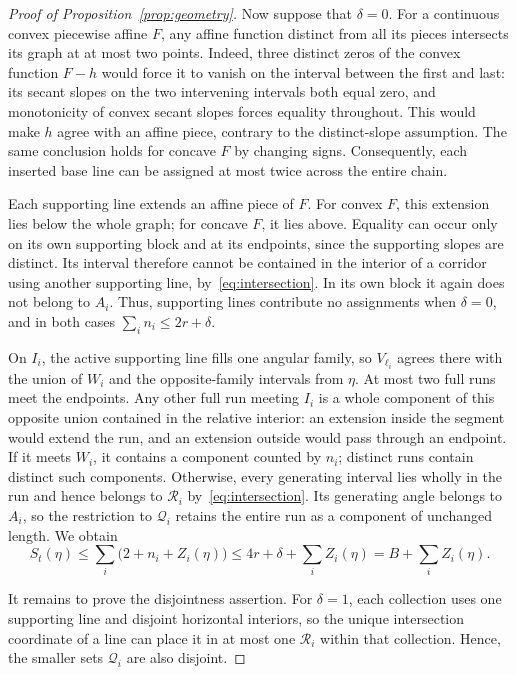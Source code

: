 \documentclass[11pt,letterpaper]{article}
\begin{document}
\begin{proof}[Proof of Proposition~\ref{prop:geometry}]
Now suppose that $\delta=0$. For a continuous convex piecewise affine $F$, any affine function distinct from all its pieces intersects its graph at at most two points. Indeed, three distinct zeros of the convex function $F-h$ would force it to vanish on the interval between the first and last: its secant slopes on the two intervening intervals both equal zero, and monotonicity of convex secant slopes forces equality throughout. This would make $h$ agree with an affine piece, contrary to the distinct-slope assumption. The same conclusion holds for concave $F$ by changing signs. Consequently, each inserted base line can be assigned at most twice across the entire chain.

Each supporting line extends an affine piece of $F$. For convex $F$, this extension lies below the whole graph; for concave $F$, it lies above. Equality can occur only on its own supporting block and at its endpoints, since the supporting slopes are distinct. Its interval therefore cannot be contained in the interior of a corridor using another supporting line, by~\eqref{eq:intersection}. In its own block it again does not belong to $A_i$. Thus, supporting lines contribute no assignments when $\delta=0$, and in both cases $\sum_i n_i\le2r+\delta$.

On $I_i$, the active supporting line fills one angular family, so $V_{\ell_i}$ agrees there with the union of $W_i$ and the opposite-family intervals from $\eta$. At most two full runs meet the endpoints. Any other full run meeting $I_i$ is a whole component of this opposite union contained in the relative interior: an extension inside the segment would extend the run, and an extension outside would pass through an endpoint. If it meets $W_i$, it contains a component counted by $n_i$; distinct runs contain distinct such components. Otherwise, every generating interval lies wholly in the run and hence belongs to $\mathscr R_i$ by~\eqref{eq:intersection}. Its generating angle belongs to $A_i$, so the restriction to $\mathscr Q_i$ retains the entire run as a component of unchanged length. We obtain
\begin{equation}\label{eq:assign}
 S_t(\eta)\le\sum_i\big(2+n_i+Z_i(\eta)\big)
             \le4r+\delta+\sum_iZ_i(\eta)=B+\sum_iZ_i(\eta).
\end{equation}

It remains to prove the disjointness assertion. For $\delta=1$, each collection uses one supporting line and disjoint horizontal interiors, so the unique intersection coordinate of a line can place it in at most one $\mathscr R_i$ within that collection. Hence, the smaller sets $\mathscr Q_i$ are also disjoint.


\end{proof}
\end{document}
